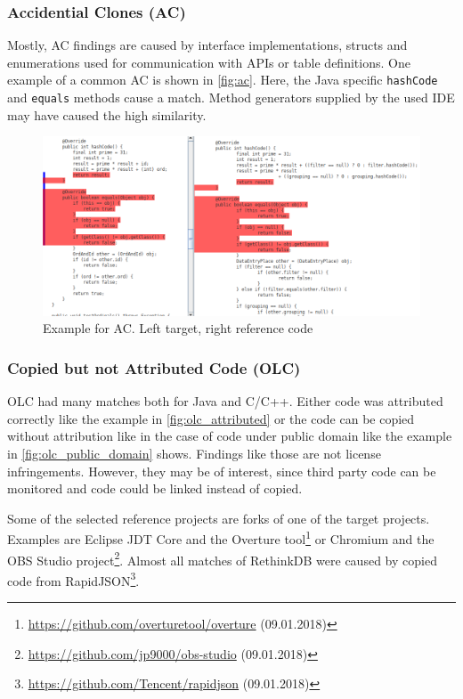 \subsubsection*{Accidential Clones (AC)}
Mostly, AC findings are caused by interface implementations, structs and enumerations used for communication with APIs or table definitions.
One example of a common AC is shown in \autoref{fig:ac}.
Here, the Java specific \texttt{hashCode} and \texttt{equals} methods cause a match.
Method generators supplied by the used IDE may have caused the high similarity.
\begin{figure}[htpb]
	\centering
	\includegraphics[width=\linewidth]{figures/ac.png}
	\caption{Example for AC. Left target, right reference code}\label{fig:ac}
\end{figure}

\newpage
\subsubsection*{Copied but not Attributed Code (OLC)}
OLC had many matches both for Java and C/C++.
Either code was attributed correctly like the example in \autoref{fig:olc_attributed} or the code can be copied without attribution like in the case of code under public domain like the example in \autoref{fig:olc_public_domain} shows.
Findings like those are not license infringements.
However, they may be of interest, since third party code can be monitored and code could be linked instead of copied.

Some of the selected reference projects are forks of one of the target projects.
Examples are Eclipse JDT Core and the Overture tool\footnote{\href{https://github.com/overturetool/overture}{https://github.com/overturetool/overture} (09.01.2018)} or Chromium and the OBS Studio project\footnote{\href{https://github.com/jp9000/obs-studio}{https://github.com/jp9000/obs-studio} (09.01.2018)}.
Almost all matches of RethinkDB were caused by copied code from RapidJSON\footnote{\href{https://github.com/Tencent/rapidjson}{https://github.com/Tencent/rapidjson} (09.01.2018)}.

